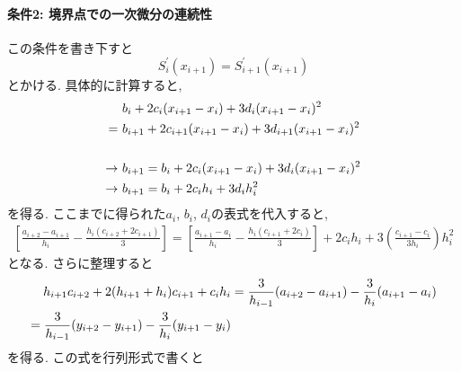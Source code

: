 \paragraph{条件2: 境界点での一次微分の連続性}
この条件を書き下すと
\begin{equation}
    S_{i}^{\prime} (x_{i+1}) = S_{i+1}^{\prime}(x_{i+1})
\end{equation}
とかける. 具体的に計算すると,
\begin{align}
    &
    b_{i} + 2 c_{i} (x_{i+1} - x_{i}) + 3 d_{i} (x_{i+1} - x_{i})^{2}
    \notag \\ = ~
    &
    b_{i+1} + 2 c_{i+1} (x_{i+1} - x_{i}) + 3 d_{i+1} (x_{i+1} - x_{i})^{2}
    \notag \\
    \notag \\ \to~
    &
    b_{i+1} = b_{i} + 2c_{i} (x_{i+1} - x_{i}) + 3 d_{i} (x_{i+1} - x_{i})^{2}
    \notag \\ \to~
    &
    b_{i+1} = b_{i} + 2c_{i} h_{i} + 3d_{i} h_{i}^{2}
    \notag
\end{align}
を得る. ここまでに得られた$a_{i}$, $b_{i}$, $d_{i}$の表式を代入すると,
\begin{align}
    \left[
        \frac{a_{i+2} - a_{i+1}}{h_{i}} -
        \frac{h_{i}(c_{i+2} + 2c_{i+1})}{3}
    \right]
    =
    \left[
        \frac{a_{i+1} - a_{i}}{h_{i}} -
        \frac{h_{i}(c_{i+1} + 2c_{i})}{3}
    \right]
    +
    2c_{i}h_{i}
    +
    3 \left(\frac{c_{i+1} - c_{i}}{3 h_{i}}\right) h_{i}^{2}
\end{align}
となる. さらに整理すると
\begin{align}
    h_{i+1} c_{i+2} + 2(h_{i+1} + h_{i}) c_{i+1} + c_{i}h_{i}
    &=
    \frac{3}{h_{i-1}}(a_{i+2} - a_{i+1}) -
    \frac{3}{h_{i}}(a_{i+1} - a_{i})
    \notag \\
    =
    \frac{3}{h_{i-1}}(y_{i+2} - y_{i+1}) -
    \frac{3}{h_{i}}(y_{i+1} - y_{i})
\end{align}
を得る. この式を行列形式で書くと
